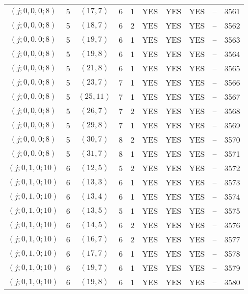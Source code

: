 \begin{longtable}{|c|c|c|c|c|c|c|c|c|c|}
$(j; 0, 0, 0; 8)$ & 5 & $(17, 7)$ & 6 & 1 & YES & YES & YES & -- & 3561\\
$(j; 0, 0, 0; 8)$ & 5 & $(18, 7)$ & 6 & 2 & YES & YES & YES & -- & 3562\\
$(j; 0, 0, 0; 8)$ & 5 & $(19, 7)$ & 6 & 1 & YES & YES & YES & -- & 3563\\
$(j; 0, 0, 0; 8)$ & 5 & $(19, 8)$ & 6 & 1 & YES & YES & YES & -- & 3564\\
$(j; 0, 0, 0; 8)$ & 5 & $(21, 8)$ & 6 & 1 & YES & YES & YES & -- & 3565\\
$(j; 0, 0, 0; 8)$ & 5 & $(23, 7)$ & 7 & 1 & YES & YES & YES & -- & 3566\\
$(j; 0, 0, 0; 8)$ & 5 & $(25, 11)$ & 7 & 1 & YES & YES & YES & -- & 3567\\
$(j; 0, 0, 0; 8)$ & 5 & $(26, 7)$ & 7 & 2 & YES & YES & YES & -- & 3568\\
$(j; 0, 0, 0; 8)$ & 5 & $(29, 8)$ & 7 & 1 & YES & YES & YES & -- & 3569\\
$(j; 0, 0, 0; 8)$ & 5 & $(30, 7)$ & 8 & 2 & YES & YES & YES & -- & 3570\\
$(j; 0, 0, 0; 8)$ & 5 & $(31, 7)$ & 8 & 1 & YES & YES & YES & -- & 3571\\
$(j; 0, 1, 0; 10)$ & 6 & $(12, 5)$ & 5 & 2 & YES & YES & YES & -- & 3572\\
$(j; 0, 1, 0; 10)$ & 6 & $(13, 3)$ & 6 & 1 & YES & YES & YES & -- & 3573\\
$(j; 0, 1, 0; 10)$ & 6 & $(13, 4)$ & 6 & 1 & YES & YES & YES & -- & 3574\\
$(j; 0, 1, 0; 10)$ & 6 & $(13, 5)$ & 5 & 1 & YES & YES & YES & -- & 3575\\
$(j; 0, 1, 0; 10)$ & 6 & $(14, 5)$ & 6 & 2 & YES & YES & YES & -- & 3576\\
$(j; 0, 1, 0; 10)$ & 6 & $(16, 7)$ & 6 & 2 & YES & YES & YES & -- & 3577\\
$(j; 0, 1, 0; 10)$ & 6 & $(17, 7)$ & 6 & 1 & YES & YES & YES & -- & 3578\\
$(j; 0, 1, 0; 10)$ & 6 & $(19, 7)$ & 6 & 1 & YES & YES & YES & -- & 3579\\
$(j; 0, 1, 0; 10)$ & 6 & $(19, 8)$ & 6 & 1 & YES & YES & YES & -- & 3580
\end{longtable}
